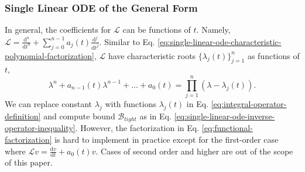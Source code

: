\documentclass[accepted]{uai2023}
\newcommand{\Bound}{\mathcal{B}}
\renewcommand{\L}{\mathcal{L}}
\begin{document}
\subsubsection{Single Linear ODE of the General Form}
   In general, the coefficients for $\L$ can be functions of $t$. Namely, $\L = \frac{\mathrm d^n}{\mathrm d t^n} +  \sum_{j=0}^{n-1}a_j(t)\frac{\mathrm d^j}{\mathrm d t^j}$.
   Similar to Eq. \ref{eq:single-linear-ode-characteristic-polynomial-factorization}, $\L$ have characteristic roots $\{\lambda_{j}(t)\}_{j=1}^{n}$ as functions of $t$,
    {
        \small
        \begin{equation*} \label{eq:functional-factorization}
            \lambda^n + a_{n-1}(t)\lambda^{n-1} + \dots + a_0(t) = \prod_{j=1}^{n}(\lambda - \lambda_j(t)).
        \end{equation*}
    }
    We can replace constant $\lambda_j$ with functions $\lambda_j(t)$ in Eq. \ref{eq:integral-operator-definition} and compute bound $\Bound_{tight}$ as in Eq. \ref{eq:single-linear-ode-inverse-operator-inequality}.
    However, the factorization in Eq. \ref{eq:functional-factorization} is hard to implement in practice except for the first-order case  where $\L v = \frac{\mathrm{d}v}{\mathrm{d}t} + a_0(t)v$. 
    Cases of second order and higher are out of the scope of this paper.
\end{document}
